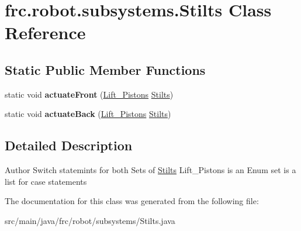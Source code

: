 \hypertarget{classfrc_1_1robot_1_1subsystems_1_1_stilts}{}\section{frc.\+robot.\+subsystems.\+Stilts Class Reference}
\label{classfrc_1_1robot_1_1subsystems_1_1_stilts}
\subsection*{Static Public Member Functions}
\begin{DoxyCompactItemize}
\item 
\mbox{\label{classfrc_1_1robot_1_1subsystems_1_1_stilts_af50dae1fe4775c73cefb856685f1e99a}} 
static void {\bfseries actuate\+Front} (\hyperlink{enumfrc_1_1robot_1_1_enums_1_1_lift___pistons}{Lift\+\_\+\+Pistons} \hyperlink{classfrc_1_1robot_1_1subsystems_1_1_stilts}{Stilts})
\item 
\mbox{\label{classfrc_1_1robot_1_1subsystems_1_1_stilts_a450a870f59c6692eaac864def617ec71}} 
static void {\bfseries actuate\+Back} (\hyperlink{enumfrc_1_1robot_1_1_enums_1_1_lift___pistons}{Lift\+\_\+\+Pistons} \hyperlink{classfrc_1_1robot_1_1subsystems_1_1_stilts}{Stilts})
\end{DoxyCompactItemize}


\subsection{Detailed Description}
\begin{DoxyAuthor}{Author}
Switch statemints for both Sets of \hyperlink{classfrc_1_1robot_1_1subsystems_1_1_stilts}{Stilts} Lift\+\_\+\+Pistons is an Enum set is a list for case statements 
\end{DoxyAuthor}


The documentation for this class was generated from the following file\+:\begin{DoxyCompactItemize}
\item 
src/main/java/frc/robot/subsystems/Stilts.\+java\end{DoxyCompactItemize}
